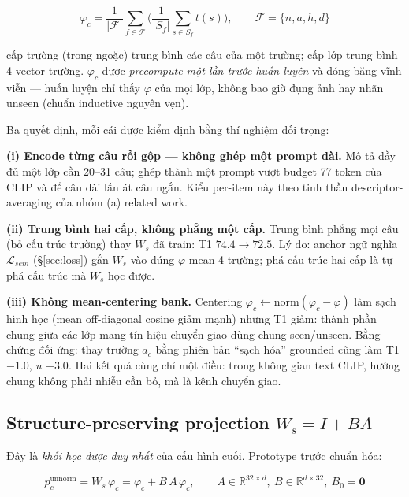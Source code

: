 \documentclass[10pt,twocolumn,letterpaper]{article}
\newcommand{\R}{\mathbb{R}}
\begin{document}
\begin{equation}
\varphi_c
= \frac{1}{|\mathcal F|}\sum_{f\in\mathcal F}
\Big(\frac{1}{|S_f|}\sum_{s\in S_f} t(s)\Big),
\qquad \mathcal F=\{n,a,h,d\}
\label{eq:phi}
\end{equation}

cấp trường (trong ngoặc) trung bình các câu của một trường; cấp lớp trung bình 4 vector trường. $\varphi_c$ được \emph{precompute một lần trước huấn luyện} và đóng băng vĩnh viễn — huấn luyện chỉ thấy $\varphi$ của mọi lớp, không bao giờ đụng ảnh hay nhãn unseen (chuẩn inductive nguyên vẹn).

Ba quyết định, mỗi cái được kiểm định bằng thí nghiệm đối trọng:

\textbf{(i) Encode từng câu rồi gộp — không ghép một prompt dài.} Mô tả đầy đủ một lớp cần 20--31 câu; ghép thành một prompt vượt budget 77 token của CLIP và để câu dài lấn át câu ngắn. Kiểu per-item này theo tinh thần descriptor-averaging của nhóm (a) related work.

\textbf{(ii) Trung bình hai cấp, không phẳng một cấp.} Trung bình phẳng mọi câu (bỏ cấu trúc trường) thay $W_s$ đã train: T1 $74.4 \to 72.5$. Lý do: anchor ngữ nghĩa $\mathcal L_{sem}$ (§\ref{sec:loss}) gắn $W_s$ vào đúng $\varphi$ mean-4-trường; phá cấu trúc hai cấp là tự phá cấu trúc mà $W_s$ học được.

\textbf{(iii) Không mean-centering bank.} Centering $\varphi_c \leftarrow \mathrm{norm}(\varphi_c - \bar\varphi)$ làm sạch hình học (mean off-diagonal cosine giảm mạnh) nhưng T1 giảm: thành phần chung giữa các lớp mang tín hiệu chuyển giao dùng chung seen/unseen. Bằng chứng đối ứng: thay trường $a_c$ bằng phiên bản ``sạch hóa'' grounded cũng làm T1 $-1.0$, $u$ $-3.0$. Hai kết quả cùng chỉ một điều: trong không gian text CLIP, hướng chung không phải nhiễu cần bỏ, mà là kênh chuyển giao.

\subsection{Structure-preserving projection $W_s = I + BA$}
\label{sec:ws}

Đây là \emph{khối học được duy nhất} của cấu hình cuối. Prototype trước chuẩn hóa:

\begin{equation}
p_c^{\text{unnorm}} = W_s\,\varphi_c = \varphi_c + B\,A\,\varphi_c,
\qquad
A\in\R^{32\times d},\ B\in\R^{d\times 32},\ B_0=\mathbf 0
\label{eq:ws}
\end{equation}
\end{document}
